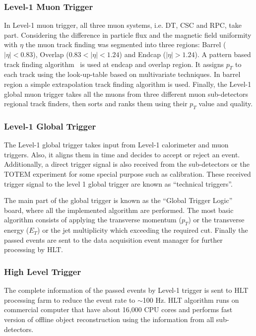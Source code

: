 

\subsubsection{Level-1 Muon Trigger} %
\label{ssub:l1_muon_trigger}
In Level-1 muon trigger, all three muon systems, i.e. DT, CSC and RPC, take part. Considering the difference in particle flux and the magnetic field uniformity with $\eta$ the muon track finding was segmented into three regions: Barrel ($|\eta|<0.83$), Overlap ($0.83<|\eta| < 1.24$) and Endcap ($|\eta|>1.24$). A pattern based track finding algorithm~\cite{Eroe2008} is used at endcap and overlap region. It assigns $p_T$ to each track using the look-up-table based on multivariate techniques. In barrel region a simple extrapolation track finding algorithm is used. Finally, the Level-1 global muon trigger takes all the muons from three different muon sub-detectors regional track finders, then sorts and ranks them using their $p_T$ value and quality.


\subsubsection{Level-1 Global Trigger} %
\label{ssub:l1_global_trigger}
The Level-1 global trigger takes input from Level-1 calorimeter and  muon triggers. Also, it aligns them in time and  decides to accept or reject an event. Additionally, a direct trigger signal is also received from the sub-detectors or the TOTEM experiment for some special purpose such as calibration. These received trigger signal to the level 1 global trigger are known as ``technical triggers''. 

The main part of the global trigger is known as the ``Global Trigger Logic'' board, where all the implemented algorithm are performed. The most basic algorithm consists of applying the transverse momentum ($p_T$) or the transverse energy ($E_T$) or the jet multiplicity which exceeding the required cut. Finally the passed events are sent to the data acquisition event manager for further processing by HLT.



\subsubsection{High Level Trigger} %
\label{ssub:high_level_trigger}
The complete information of the passed events by Level-1 trigger is sent to HLT processing farm to reduce the event rate to $\sim$100 Hz. HLT algorithm runs on commercial computer that have about 16,000 CPU cores and performs fast version of offline object reconstruction using the information from all sub-detectors. 

